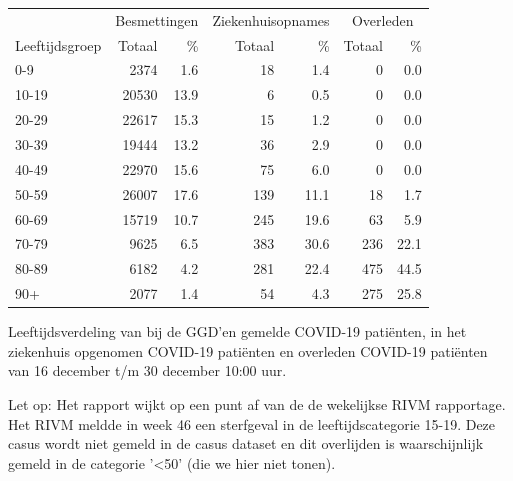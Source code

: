 \documentclass[
  english,
  man,floatsintext]{apa6}
\begin{document}
\begin{table}[H]
\centering\begingroup\fontsize{11}{13}\selectfont

\begin{threeparttable}
\begin{tabular}{lrrrrrr}
\toprule
\multicolumn{1}{c}{ } & \multicolumn{2}{c}{Besmettingen} & \multicolumn{2}{c}{Ziekenhuisopnames} & \multicolumn{2}{c}{Overleden} \\
\cmidrule(l{3pt}r{3pt}){2-3} \cmidrule(l{3pt}r{3pt}){4-5} \cmidrule(l{3pt}r{3pt}){6-7}
Leeftijdsgroep & Totaal & \% & Totaal & \% & Totaal & \%\\
\midrule
0-9 & 2374 & 1.6 & 18 & 1.4 & 0 & 0.0\\
10-19 & 20530 & 13.9 & 6 & 0.5 & 0 & 0.0\\
20-29 & 22617 & 15.3 & 15 & 1.2 & 0 & 0.0\\
30-39 & 19444 & 13.2 & 36 & 2.9 & 0 & 0.0\\
40-49 & 22970 & 15.6 & 75 & 6.0 & 0 & 0.0\\
50-59 & 26007 & 17.6 & 139 & 11.1 & 18 & 1.7\\
60-69 & 15719 & 10.7 & 245 & 19.6 & 63 & 5.9\\
70-79 & 9625 & 6.5 & 383 & 30.6 & 236 & 22.1\\
80-89 & 6182 & 4.2 & 281 & 22.4 & 475 & 44.5\\
90+ & 2077 & 1.4 & 54 & 4.3 & 275 & 25.8\\
\bottomrule
\end{tabular}
\begin{tablenotes}
\item[1] Leeftijdsverdeling van bij de GGD’en gemelde COVID-19 patiënten, in het ziekenhuis opgenomen COVID-19 patiënten en overleden COVID-19 patiënten van 16 december t/m 30 december 10:00 uur.
\item[2] Let op: Het rapport wijkt op een punt af van de de wekelijkse RIVM rapportage. Het RIVM meldde in week 46 een sterfgeval in de leeftijdscategorie 15-19. Deze casus wordt niet gemeld in de casus dataset en dit overlijden is waarschijnlijk gemeld in de categorie '<50' (die we hier niet tonen).
\end{tablenotes}
\end{threeparttable}
\endgroup{}
\end{table}

\newpage
\end{document}
